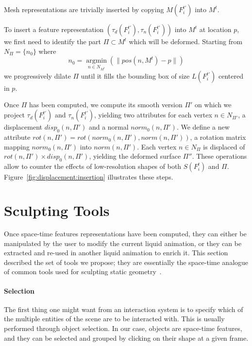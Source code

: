 Mesh representations are trivially inserted by copying $M(F^{t'}_i)$ into $M^t$.

To insert a feature representation $(\tau_d(F^{t'}_i), \tau_n(F^{t'}_i))$ into $M^t$ at location $p$, we first need to identify the part $\Pi \subset M^t$ which will be deformed.
Starting from $N_{\Pi} = \{n_0\}$ where
\begin{equation}
n_0=\underset{n\in N_{M^t}}{\operatorname{argmin}}(\|pos(n, M^t) - p\|)
\end{equation}
we progressively dilate $\Pi$ until it fills the bounding box of size $L(F^{t'}_i)$ centered in $p$.

Once $\Pi$ has been computed, we compute its smooth version $\Pi'$ on which we project $\tau_d(F^{t'}_i)$ and $\tau_n(F^{t'}_i)$, yielding two attributes for each vertex $n \in N_{\Pi'}$, a displacement $disp_0(n, \Pi')$ and a normal $norm_0(n, \Pi')$.
We define a new attribute $rot(n, \Pi') = rot(norm_0(n, \Pi'), norm(n, \Pi'))$, a rotation matrix mapping $norm_0(n, \Pi')$ into $norm(n, \Pi')$.
Each vertex $n \in N_{\Pi}$ is displaced of $rot(n, \Pi') \times disp_0(n, \Pi')$, yielding the deformed surface $\Pi''$.
These operations allow to counter the effects of low-resolution shapes of both $S(F^t_i)$ and $\Pi$. Figure~\ref{fig:displacement:insertion} illustrates these steps.

\section{Sculpting Tools}
\label{sec:manipulation}
Once space-time features representations have been computed, they can either be manipulated by the user to modify the current liquid animation, or they can be extracted and re-used in another liquid animation to enrich it.
This section described the set of tools we propose; they are essentially the space-time analogue of common tools used for sculpting static geometry~\cite{Ferley2000,schmidt2010meshmixer,Takayama2011}.

\paragraph{Selection}

The first thing one might want from an interaction system is to specify which of the multiple entities of the scene are to be interacted with.
This is usually performed through object selection.
In our case, objects are space-time features, and they can be selected and grouped by clicking on their shape at a given frame.

